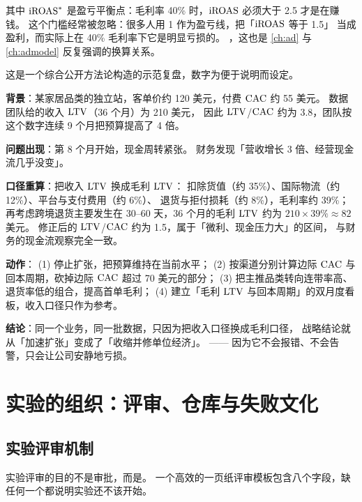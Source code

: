 其中 $\operatorname{iROAS}^{*}$ 是盈亏平衡点：毛利率 40\% 时，$\operatorname{iROAS}$ 必须大于 2.5 才是在赚钱。
这个门槛经常被忽略：很多人用 1 作为盈亏线，把「$\operatorname{iROAS}$ 等于 1.5」
当成盈利，而实际上在 40\% 毛利率下它是明显亏损的。
，这也是 \cref{ch:ad} 与 \cref{ch:admodel} 反复强调的换算关系。

\begin{casebox}
这是一个综合公开方法论构造的示范复盘，数字为便于说明而设定。

\textbf{背景}：某家居品类的独立站，客单价约 120 美元，付费 $\operatorname{CAC}$ 约 55 美元。
数据团队给的收入 $\operatorname{LTV}$（36 个月）为 210 美元，
因此 $\operatorname{LTV}$/$\operatorname{CAC}$ 约为 3.8，团队按这个数字连续 9 个月把预算提高了 4 倍。

\textbf{问题出现}：第 8 个月开始，现金周转紧张。
财务发现「营收增长 3 倍、经营现金流几乎没变」。

\textbf{口径重算}：把收入 $\operatorname{LTV}$ 换成毛利 $\operatorname{LTV}$：
扣除货值（约 35\%）、国际物流（约 12\%）、平台与支付费用（约 6\%）、
退货与拒付损耗（约 8\%），毛利率约 39\%；
再考虑跨境退货主要发生在 30--60 天，36 个月的毛利 $\operatorname{LTV}$ 约为
$210 \times 39\% \approx 82$ 美元。
修正后的 $\operatorname{LTV}$/$\operatorname{CAC}$ 约为 1.5，属于「微利、现金压力大」的区间，
与财务的现金流观察完全一致。

\textbf{动作}：
(1) 停止扩张，把预算维持在当前水平；
(2) 按渠道分别计算边际 $\operatorname{CAC}$ 与回本周期，砍掉边际 $\operatorname{CAC}$ 超过 70 美元的部分；
(3) 把主推品类转向连带率高、退货率低的组合，提高首单毛利；
(4) 建立「毛利 $\operatorname{LTV}$ 与回本周期」的双月度看板，收入口径只作为参考。

\textbf{结论}：同一个业务，同一批数据，只因为把收入口径换成毛利口径，
战略结论就从「加速扩张」变成了「收缩并修单位经济」。
——
因为它不会报错、不会告警，只会让公司安静地亏损。
\end{casebox}

\section{实验的组织：评审、仓库与失败文化}

\subsection{实验评审机制}

实验评审的目的不是审批，而是。
一个高效的一页纸评审模板包含八个字段，缺任何一个都说明实验还不该开始。

